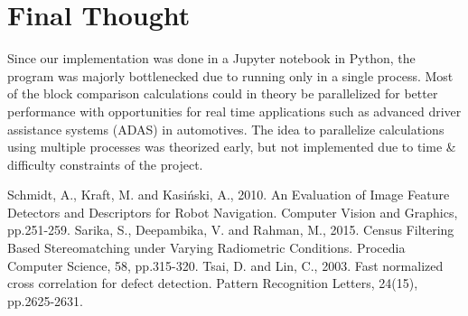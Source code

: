 \documentclass[conference]{IEEEtran}
\begin{document}
\section{Final Thought}

Since our implementation was done in a Jupyter notebook in Python, the program was majorly bottlenecked due to running only in a single process. Most of the block comparison calculations could in theory be parallelized for better performance with opportunities for real time applications such as advanced driver assistance systems (ADAS) in automotives. The idea to parallelize calculations using multiple processes was theorized early, but not implemented due to time \& difficulty constraints of the project.

\newpage
\begin{thebibliography}{00}
 Schmidt, A., Kraft, M. and Kasiński, A., 2010. An Evaluation of Image Feature Detectors and Descriptors for Robot Navigation. Computer Vision and Graphics, pp.251-259.
 Sarika, S., Deepambika, V. and Rahman, M., 2015. Census Filtering Based Stereomatching under Varying Radiometric Conditions. Procedia Computer Science, 58, pp.315-320.
 Tsai, D. and Lin, C., 2003. Fast normalized cross correlation for defect detection. Pattern Recognition Letters, 24(15), pp.2625-2631.
\end{thebibliography}
\end{document}
